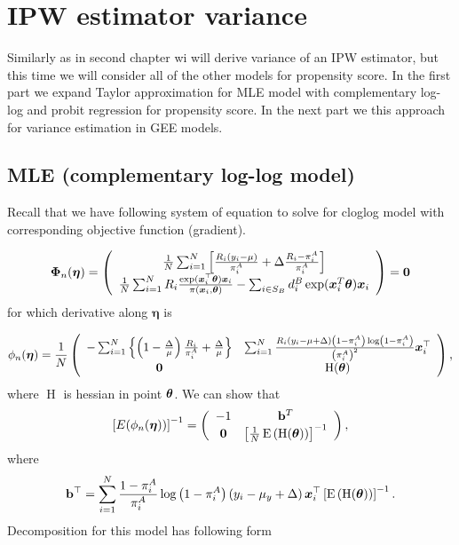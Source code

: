 \documentclass[
  letterpaper,
  DIV=11,
  numbers=noendperiod]{scrreprt}
\begin{document}
\hypertarget{ipw-estimator-variance}{%
\section{IPW estimator variance}\label{ipw-estimator-variance}}

Similarly as in second chapter wi will derive variance of an IPW
estimator, but this time we will consider all of the other models for
propensity score. In the first part we expand Taylor approximation for
MLE model with complementary log-log and probit regression for
propensity score. In the next part we this approach for variance
estimation in GEE models.

\hypertarget{mle-complementary-log-log-model}{%
\subsection{MLE (complementary log-log
model)}\label{mle-complementary-log-log-model}}

Recall that we have following system of equation to solve for cloglog
model with corresponding objective function (gradient).

\[
\begin{equation*}
\boldsymbol{\Phi}_n(\boldsymbol{\eta})=\left(\begin{array}{c}
\frac{1}{N} \sum_{i=1}^N\left[\frac{R_i\left(y_i-\mu\right)}{\pi_i^A}+\Delta \frac{R_i-\pi_i^A}{\pi_i^A}\right] \\
\frac{1}{N}\sum_{i=1}^N R_i \frac{\exp(\bx_{i}^{\top}\btheta)\bx_{i}}{\pi(\bx_{i}, \btheta)} - \sum_{i \in S_{B}}d_{i}^{B}\exp(\bx_{i}^{T}\btheta)\bx_{i}
\end{array}\right) = \bZero
\end{equation*}
\] for which derivative along \(\boldsymbol{\eta}\) is

\[
\begin{equation*}
\phi_n(\boldsymbol{\eta})=\frac{1}{N}\left(\begin{array}{cc}
-\sum_{i=1}^N\left\{\left(1-\frac{\Delta}{\mu}\right) \frac{R_i}{\pi_i^A}+\frac{\Delta}{\mu}\right\} & \sum_{i=1}^N \frac{R_i\left(y_i-\mu + \Delta\right)\left(1 - \pi_i^A\right)\log \left(1 - \pi_i^A\right)}{\left(\pi_i^A\right)^2} \boldsymbol{x}_i^{\top} \\
\mathbf{0} & \operatorname{H}(\btheta)
\end{array}\right),
\end{equation*}
\] where \(\operatorname{H}\) is hessian in point \(\boldsymbol{\theta}\). We can
show that \[
\begin{equation*}
\left[E(\phi_n(\boldsymbol{\eta}))\right]^{-1}=\left(\begin{array}{cc}
-1 & \mathbf{b}^T \\
\mathbf{0} & \left[\frac{1}{N}\operatorname{E}\left(\operatorname{H}(\btheta)\right)\right]^{-1}
\end{array}\right),
\end{equation*}
\] where \[
\mathbf{b}^{\top} = \sum_{i=1}^N \frac{1-\pi_i^A}{\pi_i^A} \log \left(1 - \pi_i^A\right) \left(y_i - \mu_y + \Delta\right) \boldsymbol{x}_i^{\top}\left[\operatorname{E}\left(\operatorname{H} (\boldsymbol{\theta})\right)\right]^{-1}.
\] Decomposition for this model has following form
\end{document}
